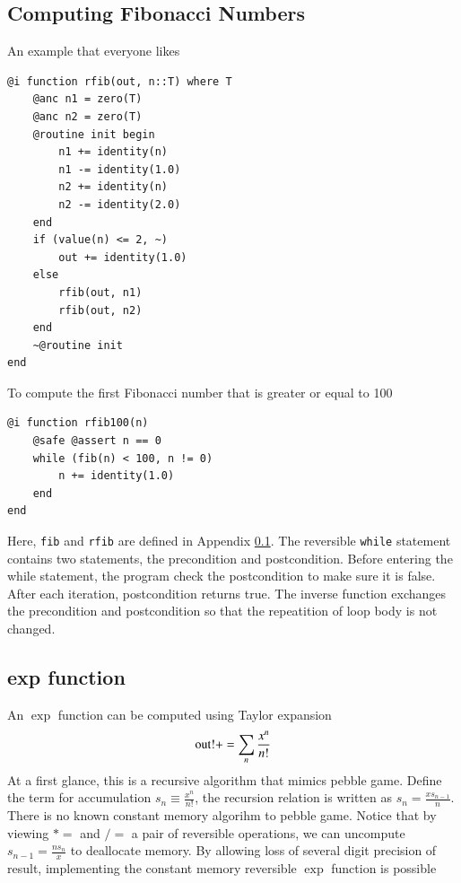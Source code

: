 \documentclass[aps,twocolumn,longbibliography,english,superscriptaddress,prr]{revtex4-1}
\newcommand{\<}{\langle}
\renewcommand{\>}{\rangle}
\newcommand{\App}[1]{Appendix \ref{#1}}
\theoremstyle{definition}\newtheorem{definition}{\textit{Definition}}
\begin{document}
\subsection{Computing Fibonacci Numbers}\label{sec:fib}
An example that everyone likes

\begin{minipage}{.44\textwidth}
\begin{lstlisting}
@i function rfib(out, n::T) where T
    @anc n1 = zero(T)
    @anc n2 = zero(T)
    @routine init begin
        n1 += identity(n)
        n1 -= identity(1.0)
        n2 += identity(n)
        n2 -= identity(2.0)
    end
    if (value(n) <= 2, ~)
        out += identity(1.0)
    else
        rfib(out, n1)
        rfib(out, n2)
    end
    ~@routine init
end
\end{lstlisting}
\end{minipage}

To compute the first Fibonacci number that is greater or equal to 100

\begin{minipage}{.44\textwidth}
\begin{lstlisting}
@i function rfib100(n)
    @safe @assert n == 0
    while (fib(n) < 100, n != 0)
        n += identity(1.0)
    end
end
\end{lstlisting}
\end{minipage}

Here, \texttt{fib} and \texttt{rfib} are defined in \App{sec:fib}.
The reversible \texttt{while} statement contains two statements, the precondition and postcondition.
Before entering the while statement, the program check the postcondition to make sure it is false.
After each iteration, postcondition returns true. The inverse function exchanges the precondition and postcondition so that the repeatition of loop body is not changed.

\subsection{exp function}
An $\exp$ function can be computed using Taylor expansion
\begin{equation}
    {\rm out!} += \sum\limits_n \frac{x^n}{n!}
\end{equation}
At a first glance, this is a recursive algorithm that mimics pebble game.
Define the term for accumulation $s_n \equiv \frac{x^n}{n!}$, the recursion relation is written as $s_n = \frac{x s_{n-1}}{n}$.
There is no known constant memory algorihm to pebble game.
Notice that by viewing $*=$ and $/=$ a pair of reversible operations, we can uncompute $s_{n-1} = \frac{n s_n}{x}$ to deallocate memory.
By allowing loss of several digit precision of result, implementing the constant memory reversible $\exp$ function is possible
\end{document}
